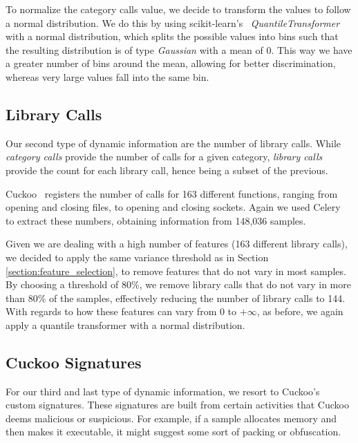 To normalize the category calls value, we decide to transform the values to follow a normal distribution.
We do this by using scikit-learn's~\cite{tool:sklearn} \textit{QuantileTransformer} with a normal distribution, which splits the possible values into bins such that the resulting distribution is of type \textit{Gaussian} with a mean of 0.
This way we have a greater number of bins around the mean, allowing for better discrimination, whereas very large values fall into the same bin.

\subsection{Library Calls}
\label{section:improvements_api_unigrams}

Our second type of dynamic information are the number of library calls.
While \textit{category calls} provide the number of calls for a given category, \textit{library calls} provide the count for each library call, hence being a subset of the previous.

Cuckoo~\cite{tool:cuckoo} registers the number of calls for 163 different functions, ranging from opening and closing files, to opening and closing sockets.
Again we used Celery~\cite{tool:celery} to extract these numbers, obtaining information from 148,036 samples.

Given we are dealing with a high number of features (163 different library calls), we decided to apply the same variance threshold as in Section \ref{section:feature_selection}, to remove features that do not vary in most samples.
By choosing a threshold of 80\%, we remove library calls that do not vary in more than 80\% of the samples, effectively reducing the number of library calls to 144.
With regards to how these features can vary from 0 to $+\infty$, as before, we again apply a quantile transformer with a normal distribution.

\subsection{Cuckoo Signatures}
\label{section:improvements_signatures}

For our third and last type of dynamic information, we resort to Cuckoo's~\cite{tool:cuckoo} custom signatures.
These signatures are built from certain activities that Cuckoo deems malicious or suspicious.
For example, if a sample allocates memory and then makes it executable, it might suggest some sort of packing or obfuscation.

